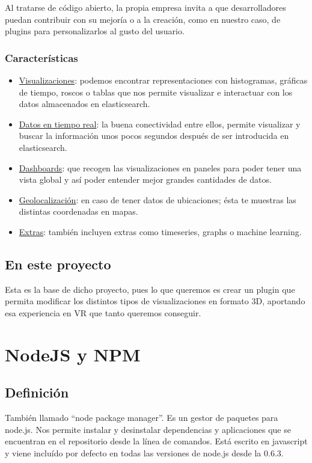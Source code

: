 \documentclass[a4paper, 12pt]{book}
\begin{document}
Al tratarse de c\'odigo abierto, la propia empresa invita a que desarrolladores puedan contribuir con su mejor\'ia o a la creaci\'on, como en nuestro caso, de plugins para personalizarlos al gusto del usuario. 
\subsubsection{Caracter\'isticas}
\begin{itemize}
\item \underline{Visualizaciones}: podemos encontrar representaciones con histogramas, gr\'aficas de tiempo, roscos o tablas que nos permite visualizar e interactuar con los datos almacenados en elasticsearch.
\item \underline{Datos en tiempo real}: la buena conectividad entre ellos, permite visualizar y buscar la informaci\'on unos pocos segundos despu\'es de ser introducida en elasticsearch.
\item \underline{Dashboards}: que recogen las visualizaciones en paneles para poder tener una vista global y as\'i poder entender mejor grandes cantidades de datos.
\item \underline{Geolocalizaci\'on}: en caso de tener datos de ubicaciones; \'esta te muestras las distintas coordenadas en mapas.
\item \underline{Extras}: tambi\'en incluyen extras como timeseries, graphs o machine learning.
\end{itemize}
\subsection{En este proyecto}
Esta es la base de dicho proyecto, pues lo que queremos es crear un plugin que permita modificar los distintos tipos de visualizaciones en formato 3D, aportando esa experiencia en VR que tanto queremos conseguir.



\section{NodeJS y NPM}
\label{sec:nodejs}
\subsection{Definici\'on}
También llamado “node package manager”. Es un gestor de paquetes para node.js. Nos permite instalar y desinstalar dependencias y aplicaciones que se encuentran en el repositorio desde la línea de comandos. Está escrito en javascript y viene incluído por defecto en todas las versiones de node.js desde la 0.6.3.
\end{document}
